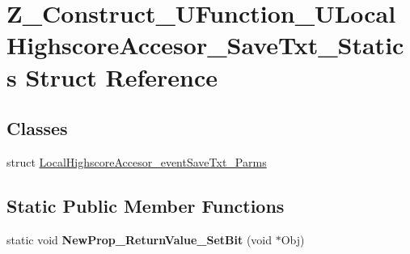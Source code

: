 \hypertarget{struct_z___construct___u_function___u_local_highscore_accesor___save_txt___statics}{}\section{Z\+\_\+\+Construct\+\_\+\+U\+Function\+\_\+\+U\+Local\+Highscore\+Accesor\+\_\+\+Save\+Txt\+\_\+\+Statics Struct Reference}
\label{struct_z___construct___u_function___u_local_highscore_accesor___save_txt___statics}
\subsection*{Classes}
\begin{DoxyCompactItemize}
\item 
struct \mbox{\hyperlink{struct_z___construct___u_function___u_local_highscore_accesor___save_txt___statics_1_1_local_hig914a192ebe959b6f132c04f9610f193b}{Local\+Highscore\+Accesor\+\_\+event\+Save\+Txt\+\_\+\+Parms}}
\end{DoxyCompactItemize}
\subsection*{Static Public Member Functions}
\begin{DoxyCompactItemize}
\item 
\mbox{\label{struct_z___construct___u_function___u_local_highscore_accesor___save_txt___statics_ae64464ba95154f36b8dc306a1a5a10ef}} 
static void {\bfseries New\+Prop\+\_\+\+Return\+Value\+\_\+\+Set\+Bit} (void $\ast$Obj)
\end{DoxyCompactItemize}
